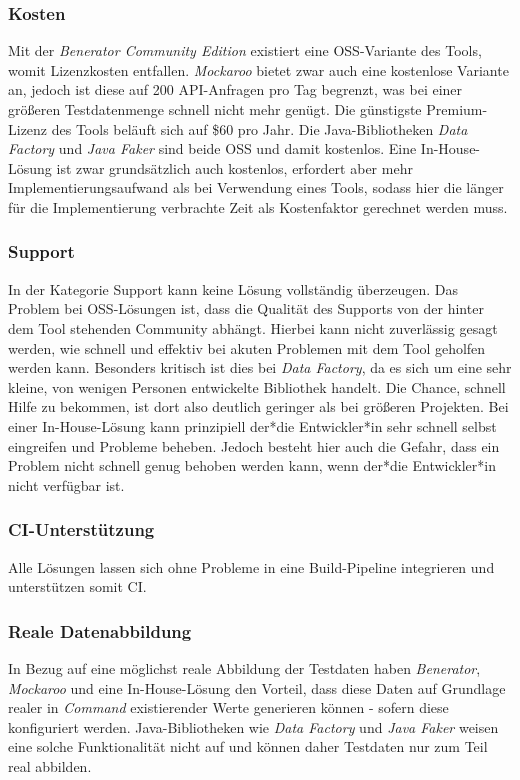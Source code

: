 \subsubsection*{Kosten}
Mit der \textit{Benerator Community Edition} existiert eine \ac{OSS}-Variante des Tools, womit Lizenzkosten entfallen. \cite{beneratorce:2022} \cite{singh:2015} \textit{Mockaroo} bietet zwar auch eine kostenlose Variante an, jedoch ist diese auf 200 \ac{API}-Anfragen pro Tag begrenzt, was bei einer größeren Testdatenmenge schnell nicht mehr genügt. Die günstigste Premium-Lizenz des Tools beläuft sich auf \$60 pro Jahr. Die Java-Bibliotheken \textit{Data Factory} und \textit{Java Faker} sind beide \ac{OSS} und damit kostenlos. Eine In-House-Lösung ist zwar grundsätzlich auch kostenlos, erfordert aber mehr Implementierungsaufwand als bei Verwendung eines Tools, sodass hier die länger für die Implementierung verbrachte Zeit als Kostenfaktor gerechnet werden muss.

\subsubsection*{Support}
In der Kategorie Support kann keine Lösung vollständig überzeugen. Das Problem bei \ac{OSS}-Lösungen ist, dass die Qualität des Supports von der hinter dem Tool stehenden Community abhängt. Hierbei kann nicht zuverlässig gesagt werden, wie schnell und effektiv bei akuten Problemen mit dem Tool geholfen werden kann. Besonders kritisch ist dies bei \textit{Data Factory}, da es sich um eine sehr kleine, von wenigen Personen entwickelte Bibliothek handelt. Die Chance, schnell Hilfe zu bekommen, ist dort also deutlich geringer als bei größeren Projekten. Bei einer In-House-Lösung kann prinzipiell der*die Entwickler*in sehr schnell selbst eingreifen und Probleme beheben. Jedoch besteht hier auch die Gefahr, dass ein Problem nicht schnell genug behoben werden kann, wenn der*die Entwickler*in nicht verfügbar ist.

\subsubsection*{\ac{CI}-Unterstützung}
Alle Lösungen lassen sich ohne Probleme in eine Build-Pipeline integrieren und unterstützen somit \ac{CI}.

\subsubsection*{Reale Datenabbildung}
In Bezug auf eine möglichst reale Abbildung der Testdaten haben \textit{Benerator}, \textit{Mockaroo} und eine In-House-Lösung den Vorteil, dass diese Daten auf Grundlage realer in \textit{Command} existierender Werte generieren können - sofern diese konfiguriert werden. Java-Bibliotheken wie \textit{Data Factory} und \textit{Java Faker} weisen eine solche Funktionalität nicht auf und können daher Testdaten nur zum Teil real abbilden.

